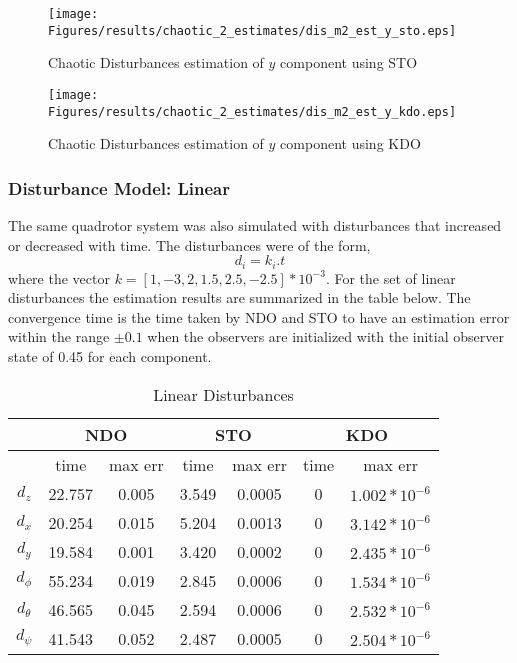 \documentclass{article}
\begin{document}
\begin{figure}[H]
\centering
\texttt{[image: Figures/results/chaotic\_2\_estimates/dis\_m2\_est\_y\_sto.eps]}
\caption{Chaotic Disturbances estimation of $y$ component using STO}
\label{dis_m2_est_y_sto}
\end{figure}

\begin{figure}[H]
\centering
\texttt{[image: Figures/results/chaotic\_2\_estimates/dis\_m2\_est\_y\_kdo.eps]}
\caption{Chaotic Disturbances estimation of $y$ component using KDO}
\label{dis_m2_est_y_kdo}
\end{figure}

\subsubsection{Disturbance Model: Linear}
The same quadrotor system was also simulated with disturbances that increased or decreased with time. The disturbances were of the form, 
\begin{equation}
d_i = k_i.t
\end{equation}
where the vector $k=[1,-3,2,1.5,2.5,-2.5]*10^{-3}$. 
For the set of linear disturbances the estimation results are summarized in the table below. The convergence time is the time taken by NDO and STO to have an estimation error within the range $\pm0.1$ when the observers are initialized with the initial observer state of 0.45 for each component. 
\begin{table}[!htbp]
\centering
\caption{Linear Disturbances}
\begin{tabular}{*7c}
\toprule
{} &  \multicolumn{2}{c}{NDO} & \multicolumn{2}{c}{STO} & \multicolumn{2}{c}{KDO}\\
\midrule
{}        &   time   & max err  & time  & max err& time  & max err\\
$d_z$     &  22.757 & 0.005   & 3.549  & 0.0005 & 0     & $1.002*10^{-6}$\\
$d_x$     &  20.254 & 0.015   & 5.204  & 0.0013 & 0     & $3.142*10^{-6}$\\
$d_y$     &  19.584 & 0.001   & 3.420  & 0.0002 & 0     & $2.435*10^{-6}$\\
$d_\phi$  &  55.234 & 0.019   & 2.845  & 0.0006 & 0     & $1.534*10^{-6}$\\
$d_\theta$&  46.565 & 0.045   & 2.594  & 0.0006 & 0     & $2.532*10^{-6}$\\
$d_\psi$  &  41.543 & 0.052   & 2.487  & 0.0005 & 0     & $2.504*10^{-6}$\\
\bottomrule
\end{tabular}
\end{table}
\end{document}
